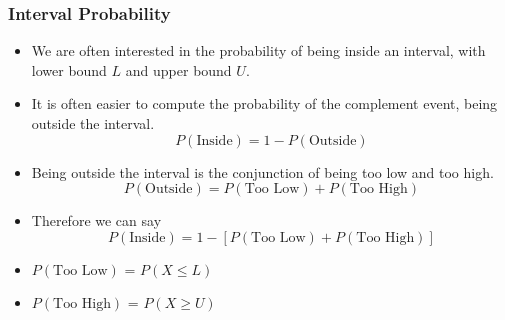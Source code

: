%
%
%
%


\begin{frame}
\frametitle{Interval Probability}
\begin{itemize}
\item We are often interested in the probability of being inside an interval, with lower bound $L$ and upper bound $U$.
\item It is often easier to compute the probability of the complement event, being outside the interval.
\[ P( \mbox{Inside} ) = 1 - P( \mbox{Outside} )  \]

\item Being outside the interval is the conjunction of being too low and too high.
\[ P( \mbox{Outside} ) = P( \mbox{Too Low} ) +  P( \mbox{Too High} ) \]

\item Therefore we can say
\[ P( \mbox{Inside} ) = 1- [P( \mbox{Too Low} ) +  P( \mbox{Too High} )] \]
\item $P( \mbox{Too Low} )$ = $P( X \leq L)$
\item $P( \mbox{Too High} )$ = $P( X \geq U)$
\end{itemize}
\end{frame}


